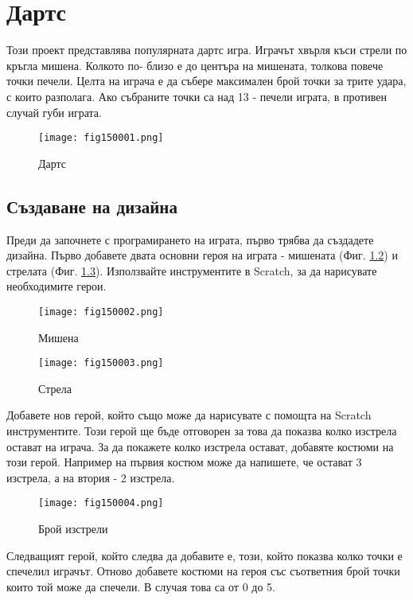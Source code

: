 \chapter{Дартс}

Този проект представлява популярната дартс игра. Играчът хвърля къси стрели по кръгла мишена. Колкото по- близо е до центъра на мишената, толкова повече точки печели. Целта на играча е да събере максимален брой точки за трите удара, с които разполага. Ако събраните точки са над 13 - печели играта, в противен случай губи играта.

\begin{figure}[H]
  \centering
  \texttt{[image: fig150001.png]}
  \caption{Дартс}
\label{fig150001}
\end{figure}

\section{Създаване на дизайна}
Преди да започнете с програмирането на играта, първо трябва да създадете дизайна. Първо добавете двата основни героя на играта - мишената (Фиг. \ref{fig150002}) и стрелата (Фиг. \ref{fig150003}). Използвайте инструментите в Scratch, за да нарисувате необходимите герои.

\begin{figure}[H]
  \centering
  \texttt{[image: fig150002.png]}
  \caption{Мишена}
\label{fig150002}
\end{figure}

\begin{figure}[H]
  \centering
  \texttt{[image: fig150003.png]}
  \caption{Стрела}
\label{fig150003}
\end{figure}

Добавете нов герой, който също може да нарисувате с помощта на Scratch инструментите. Този герой ще бъде отговорен за това да показва колко изстрела остават на играча. За да покажете колко изстрела остават, добавяте костюми на този герой. Например на първия костюм може да напишете, че остават 3 изстрела, а на втория - 2 изстрела.

\begin{figure}[H]
  \centering
  \texttt{[image: fig150004.png]}
  \caption{Брой изстрели}
\label{fig150004}
\end{figure}

Следващият герой, който следва да добавите е, този, който показва колко точки е спечелил играчът. Отново добавете костюми на героя със съответния брой точки които той може да спечели. В случая това са от 0 до 5.

